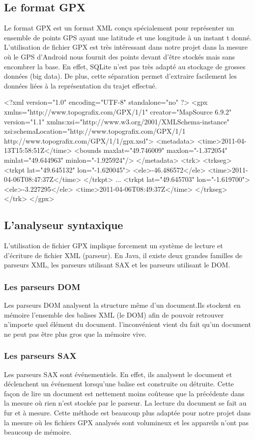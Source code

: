 \subsection{Le format GPX}
Le format GPX est un format XML conçu spécialement pour représenter un ensemble de points GPS ayant une latitude et une longitude à un instant t donné. L'utilisation de fichier GPX est très intéressant dans notre projet dans la mesure où le GPS d'Android nous fournit des points devant d'être stockés mais sans encombrer la base. En effet, SQLite n'est pas très adapté au stockage de grosses données (big data). De plus, cette séparation permet d'extraire facilement les données liées à la représentation du trajet effectué.

\begin{xml}
<?xml version="1.0" encoding="UTF-8" standalone="no" ?>
<gpx xmlns="http://www.topografix.com/GPX/1/1" creator="MapSource 6.9.2" version="1.1" xmlns:xsi="http://www.w3.org/2001/XMLSchema-instance" xsi:schemaLocation="http://www.topografix.com/GPX/1/1 http://www.topografix.com/GPX/1/1/gpx.xsd">
  <metadata>
    <time>2011-04-13T15:58:51Z</time>
    <bounds maxlat="49.746009" maxlon="-1.372054" minlat="49.644963" minlon="-1.925924"/>
  </metadata>
  <trk>
    <trkseg>
      <trkpt lat="49.645132" lon="-1.620045">
        <ele>-46.486572</ele>
        <time>2011-04-06T08:47:37Z</time>
      </trkpt>
     ...
      <trkpt lat="49.645703" lon="-1.619700">
        <ele>-3.227295</ele>
        <time>2011-04-06T08:49:37Z</time>
    </trkseg>
  </trk>
</gpx>
\end{xml}

\subsection{L'analyseur syntaxique}
L'utilisation de fichier GPX implique forcement un système de lecture et d'écriture de fichier XML (parseur). En Java, il existe deux grandes familles de parseurs XML, les parseurs utilisant SAX et les parseurs utilisant le DOM.

\subsubsection{Les parseurs DOM}
Les parseurs DOM analysent la structure même d'un document.Ils stockent en mémoire l'ensemble des balises XML (le DOM) afin de pouvoir retrouver n'importe quel élément du document. l'inconvénient vient du fait qu'un document ne peut pas être plus gros que la mémoire vive. 

\subsubsection{Les parseurs SAX}
Les parseurs SAX sont événementiels. En effet, ils analysent le document et déclenchent un événement lorsqu'une balise est construite ou détruite. Cette façon de lire un document est nettement moins coûteuse que la précédente dans la mesure où rien n'est stockée par le parseur. La lecture du document se fait au fur et à mesure. Cette méthode est beaucoup plus adaptée pour notre projet dans la mesure où les fichiers GPX analysés sont volumineux et les appareils n'ont pas beaucoup de mémoire. 
